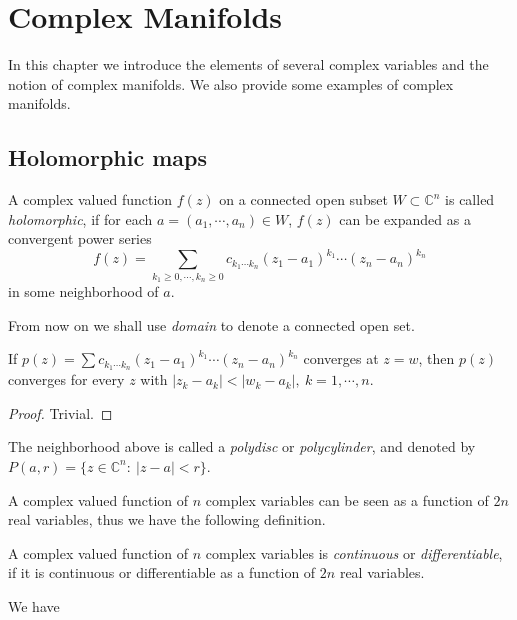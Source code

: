 \chapter{Complex Manifolds}

In this chapter we introduce the elements of several complex variables and the notion of complex manifolds.
We also provide some examples of complex ma\-nifolds.

\section{Holomorphic maps}

\begin{defn}
    A complex valued function $f(z)$ on a connected open subset $W\subset\mathbb{C}^n$ is called \emph{holomorphic}, if for each $a=(a_1,\cdots,a_n)\in W$, $f(z)$ can be expanded as a convergent power series
    \[f(z)=\sum_{k_1\geq 0,\cdots,k_n\geq 0}c_{k_1\cdots k_n}(z_1-a_1)^{k_1}\cdots(z_n-a_n)^{k_n}\]
    in some neighborhood of $a$.
\end{defn}

From now on we shall use \emph{domain} to denote a connected open set.

\begin{prop}
    If $p(z)=\sum c_{k_1\cdots k_n}(z_1-a_1)^{k_1}\cdots(z_n-a_n)^{k_n}$ converges at $z=w$, then $p(z)$ converges for every $z$ with $|z_k-a_k|<|w_k-a_k|,\ k=1,\cdots,n$.
\end{prop}
\begin{proof}
    Trivial.
\end{proof}

\begin{defn}
    The neighborhood above is called a \emph{polydisc} or \emph{polycylinder}, and denoted by $P(a,r)=\{z\in\mathbb{C}^n:\ |z-a|<r\}$.
\end{defn}

A complex valued function of $n$ complex variables can be seen as a function of $2n$ real variables, thus we have the following definition.
\begin{defn}
    A complex valued function of $n$ complex variables is \emph{continuous} or \emph{differentiable}, if it is continuous or differentiable as a function of $2n$ real variables.
\end{defn}

We have

